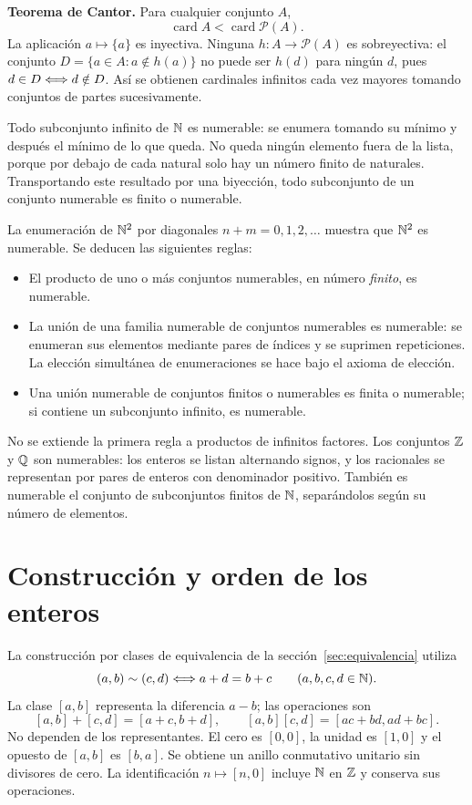 \textbf{Teorema de Cantor.} Para cualquier conjunto $A$,
\[
 \operatorname{card}A<\operatorname{card}\mathcal P(A).
\]
La aplicación $a\mapsto\{a\}$ es inyectiva. Ninguna $h:A\to\mathcal P(A)$
es sobreyectiva: el conjunto $D=\{a\in A:a\notin h(a)\}$ no puede ser
$h(d)$ para ningún $d$, pues $d\in D\Longleftrightarrow d\notin D$.
Así se obtienen cardinales infinitos cada vez mayores tomando conjuntos
de partes sucesivamente.

Todo subconjunto infinito de $\mathbb{N}$ es numerable: se enumera tomando su
mínimo y después el mínimo de lo que queda. No queda ningún elemento
fuera de la lista, porque por debajo de cada natural solo hay un número
finito de naturales. Transportando este resultado por una biyección,
todo subconjunto de un conjunto numerable es finito o numerable.

La enumeración de $\mathbb{N}^2$ por diagonales $n+m=0,1,2,\ldots$ muestra que
$\mathbb{N}^2$ es numerable. Se deducen las siguientes reglas:
\begin{itemize}
\item El producto de uno o más conjuntos numerables, en número \emph{finito},
es numerable.
\item La unión de una familia numerable de conjuntos numerables es numerable:
se enumeran sus elementos mediante pares de índices y se suprimen repeticiones.
La elección simultánea de enumeraciones se hace bajo el axioma de elección.
\item Una unión numerable de conjuntos finitos o numerables es finita o
numerable; si contiene un subconjunto infinito, es numerable.
\end{itemize}
No se extiende la primera regla a productos de infinitos factores.
Los conjuntos $\mathbb{Z}$ y $\mathbb{Q}$ son numerables: los enteros se listan alternando
signos, y los racionales se representan por pares de enteros con
denominador positivo. También es numerable el conjunto de subconjuntos
finitos de $\mathbb{N}$, separándolos según su número de elementos.

\section{Construcción y orden de los enteros}
\label{sec:enteros}
La construcción por clases de equivalencia de la
sección~\ref{sec:equivalencia} utiliza
\[
 (a,b)\sim(c,d)\Longleftrightarrow a+d=b+c\qquad(a,b,c,d\in\mathbb{N}).
\]
La clase $[a,b]$ representa la diferencia $a-b$; las operaciones son
\[
 [a,b]+[c,d]=[a+c,b+d],\qquad
 [a,b][c,d]=[ac+bd,ad+bc].
\]
No dependen de los representantes. El cero es $[0,0]$, la unidad es
$[1,0]$ y el opuesto de $[a,b]$ es $[b,a]$. Se obtiene un anillo
conmutativo unitario sin divisores de cero.
La identificación $n\mapsto[n,0]$ incluye $\mathbb{N}$ en $\mathbb{Z}$ y conserva sus
operaciones.

